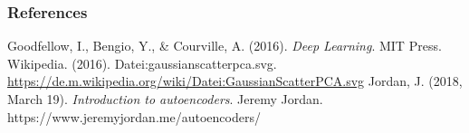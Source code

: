 
\begin{vbframe}
\frametitle{References}
\footnotesize{
\begin{thebibliography}{99}
Goodfellow, I., Bengio, Y., \& Courville, A. (2016). \textit{Deep Learning}. MIT Press.
 Wikipedia. (2016). Datei:gaussianscatterpca.svg. \url{https://de.m.wikipedia.org/wiki/Datei:GaussianScatterPCA.svg}
Jordan, J. (2018, March 19). \textit{Introduction to autoencoders}. Jeremy Jordan. https://www.jeremyjordan.me/autoencoders/ 

\end{thebibliography}
}
\end{vbframe}


\endlecture

